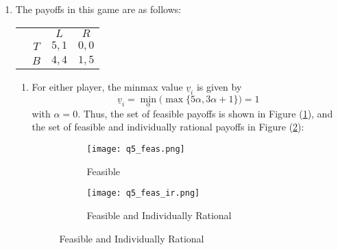 \documentclass[11pt]{article}
\begin{document}
\begin{enumerate}
	\item The payoffs in this game are as follows: 
	\begin{table}[!htbp]
		\centering
		\setlength{\extrarowheight}{2pt}
		\begin{tabular}{cc|c|c|}
			& \multicolumn{1}{c}{} & \multicolumn{1}{c}{$L$}  & \multicolumn{1}{c}{$R$} \\\cline{3-4}
			& $T$ & $ 5,1 $ & $ 0,0 $ \\\cline{3-4}
			& $B$ & $ 4,4 $ & $ 1,5 $ \\\cline{3-4}
		\end{tabular}
	\end{table}
	\begin{enumerate}
		\item For either player, the minmax value $ \underline{v}_i $ is given by
		\[\underline{v}_i = \min_\alpha\big(\max\{5\alpha, 3\alpha + 1\}\big) = 1\]
		with $\alpha = 0$. Thus, the set of feasible payoffs is shown in Figure (\ref{fig2_a}), and the set of feasible and individually rational payoffs in Figure (\ref{fig2_b}):
		\begin{figure}[!hbtp]
			\caption{}
			\begin{subfigure}{.5\textwidth}
				\centering
				\texttt{[image: q5\_feas.png]}
				\caption{Feasible}
				\label{fig2_a}
			\end{subfigure}%
			\begin{subfigure}{.5\textwidth}
				\centering
				\texttt{[image: q5\_feas\_ir.png]}
				\caption{Feasible and Individually Rational}
				\label{fig2_b}
			\end{subfigure}
			\label{fig2}
		\end{figure}
		
	\end{enumerate}
\end{enumerate}
\end{document}
